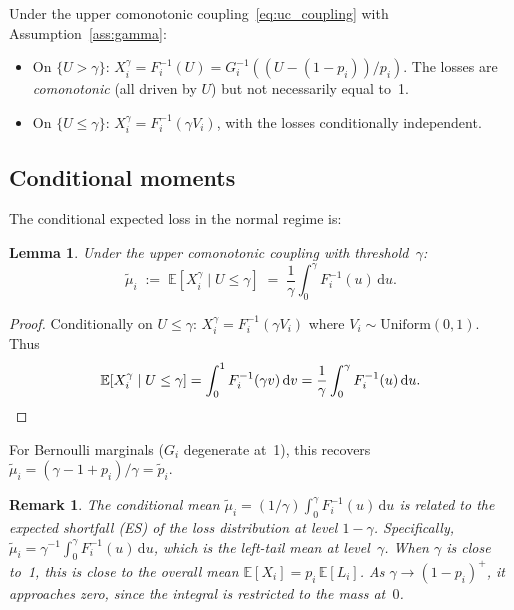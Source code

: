 \documentclass[11pt]{article}
\newtheorem{lemma}[theorem]{Lemma}
\newtheorem{remark}[theorem]{Remark}
\theoremstyle{definition}
\newcommand{\dd}{\mathrm{d}}
\newcommand{\E}{\mathbb{E}}
\newcommand{\1}{\mathbf{1}}
\begin{document}
Under the upper comonotonic coupling~\eqref{eq:uc_coupling} with Assumption~\ref{ass:gamma}:
\begin{itemize}
  \item On $\{U > \gamma\}$: $X_i^\gamma = F_i^{-1}(U) = G_i^{-1}((U - (1-p_i))/p_i)$. The losses are \emph{comonotonic} (all driven by $U$) but not necessarily equal to~1.
  \item On $\{U \leq \gamma\}$: $X_i^\gamma = F_i^{-1}(\gamma V_i)$, with the losses conditionally independent.
\end{itemize}

\subsection{Conditional moments}

The conditional expected loss in the normal regime is:
\begin{lemma}\label{lem:cond_mean_lgd}
Under the upper comonotonic coupling with threshold~$\gamma$:
\begin{equation}\label{eq:cond_mean_lgd}
  \tilde{\mu}_i \;:=\; \E[X_i^\gamma \mid U \leq \gamma] \;=\; \frac{1}{\gamma}\int_0^\gamma F_i^{-1}(u)\,\dd u.
\end{equation}
\end{lemma}

\begin{proof}
Conditionally on $U \leq \gamma$: $X_i^\gamma = F_i^{-1}(\gamma V_i)$ where $V_i \sim \mathrm{Uniform}(0,1)$. Thus
\[
  \E[X_i^\gamma \mid U \leq \gamma] = \int_0^1 F_i^{-1}(\gamma v)\,\dd v = \frac{1}{\gamma}\int_0^\gamma F_i^{-1}(u)\,\dd u. \qedhere
\]
\end{proof}

For Bernoulli marginals ($G_i$ degenerate at~1), this recovers $\tilde{\mu}_i = (\gamma - 1 + p_i)/\gamma = \tilde{p}_i$.

\begin{remark}\label{rem:cond_mean_es}
The conditional mean $\tilde{\mu}_i = (1/\gamma)\int_0^\gamma F_i^{-1}(u)\,\dd u$ is related to the expected shortfall (ES) of the loss distribution at level $1 - \gamma$. Specifically, $\tilde{\mu}_i = \gamma^{-1}\int_0^\gamma F_i^{-1}(u)\,\dd u$, which is the left-tail mean at level~$\gamma$. When $\gamma$ is close to~1, this is close to the overall mean $\E[X_i] = p_i\,\E[L_i]$. As $\gamma \to (1-p_i)^+$, it approaches zero, since the integral is restricted to the mass at~$0$.
\end{remark}
\end{document}
